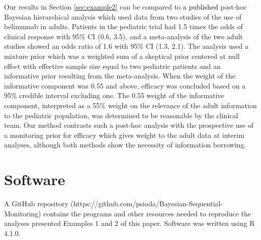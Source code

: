 \documentclass[12pt]{article}
\begin{document}
Our results in Section \ref{sec:example2} can be compared to \textcolor{black}{a published} post-hoc Bayesian hierarchical analysis \citep{Brunner2020} which used data from two studies of the use of belimumab in adults. Patients in the pediatric trial had 1.5 times the odds of clinical response with 95\% CI (0.6, 3.5), and a meta-analysis of the two adult studies showed an odds ratio of 1.6 with 95\% CI (1.3, 2.1). The analysis used a mixture prior which was a weighted sum of a skeptical prior centered at null effect with effective sample size equal to two pediatric patients and an informative prior resulting from the meta-analysis. When the weight of the informative component was 0.55 and above, efficacy was concluded based on a 95\% credible interval excluding one. The 0.55 weight of the informative component, interpreted as a 55\% weight on the relevance of the adult information to the pediatric population, was determined to be reasonable by the clinical team. Our method contrasts such a post-hoc analysis with the prospective use of a monitoring prior for efficacy which gives weight to the adult data at interim analyses, although both methods show the necessity of information borrowing. %

%


\section*{Software} \label{s:Software}
A GitHub repository (https://github.com/psioda/Bayesian-Sequential-Monitoring) contains the programs and other resources 
needed to reproduce the analyses presented Examples 1 and 2 of this paper. Software was written using R 4.1.0.
\end{document}
